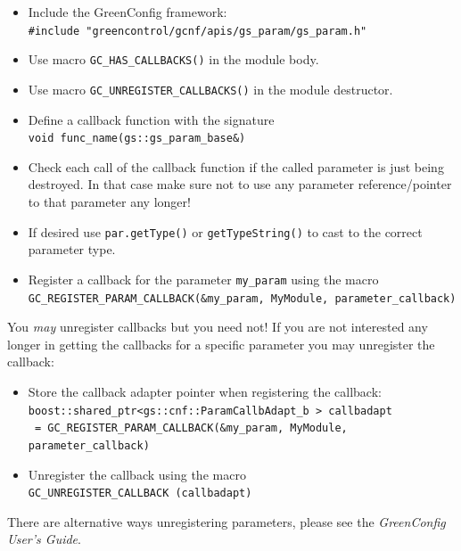 \begin{itemize}
  \item Include the GreenConfig framework: \\
           \lstinline|#include "greencontrol/gcnf/apis/gs_param/gs_param.h"|
  \item Use macro \lstinline|GC_HAS_CALLBACKS()| in the module body.
  \item Use macro \lstinline|GC_UNREGISTER_CALLBACKS()| in the module destructor.
  \item Define a callback function with the signature \\
            \lstinline|void func_name(gs::gs_param_base&)|
  \item Check each call of the callback function if the called parameter is just being destroyed. In that case make sure not to use any parameter reference/pointer to that parameter any longer!
  \item If desired use \lstinline|par.getType()| or \lstinline|getTypeString()| to cast to the correct parameter type.
\end{itemize}


\begin{itemize}
  \item Register a callback for the parameter \lstinline|my_param| using the macro \\
          \lstinline|GC_REGISTER_PARAM_CALLBACK(&my_param, MyModule, parameter_callback)|
\end{itemize}


You {\em may} unregister callbacks but you need not! If you are not interested any longer in getting the callbacks for a specific parameter you may unregister the callback:
\begin{itemize}
  \item Store the callback adapter pointer when registering the callback: \\
          \lstinline|boost::shared_ptr<gs::cnf::ParamCallbAdapt_b > callbadapt| \\
          \lstinline| = GC_REGISTER_PARAM_CALLBACK(&my_param, MyModule, parameter_callback)|
  \item Unregister the callback using the macro \\
          \lstinline|GC_UNREGISTER_CALLBACK (callbadapt)| 
\end{itemize}
There are alternative ways unregistering parameters, please see the {\em GreenConfig User's Guide}.


